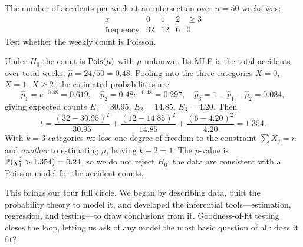 \begin{example}
The number of accidents per week at an intersection over $n=50$ weeks was:
\[
\begin{array}{c|cccc}
x & 0 & 1 & 2 & \ge 3\\\hline
\text{frequency} & 32 & 12 & 6 & 0
\end{array}
\]
Test whether the weekly count is Poisson.

\solution Under $H_0$ the count is $\mathrm{Pois}(\mu)$ with $\mu$ unknown. Its MLE is the
total accidents over total weeks, $\hat\mu=24/50=0.48$. Pooling into the three
categories $X=0$, $X=1$, $X\ge 2$, the estimated probabilities are
\[
  \hat p_1=e^{-0.48}=0.619,\quad \hat p_2=0.48e^{-0.48}=0.297,\quad \hat p_3=1-\hat p_1-\hat p_2=0.084,
\]
giving expected counts $E_1=30.95$, $E_2=14.85$, $E_3=4.20$. Then
\[
  t=\frac{(32-30.95)^2}{30.95}+\frac{(12-14.85)^2}{14.85}+\frac{(6-4.20)^2}{4.20}=1.354.
\]
With $k=3$ categories we lose one degree of freedom to the constraint
$\sum X_j=n$ and \emph{another} to estimating $\mu$, leaving $k-2=1$. The
$p$-value is $\mathbb{P}(\chi^2_1>1.354)=0.24$, so we do not reject $H_0$: the data
are consistent with a Poisson model for the accident counts.
\end{example}

\bigskip
This brings our tour full circle. We began by describing data, built the
probability theory to model it, and developed the inferential tools—estimation,
regression, and testing—to draw conclusions from it. Goodness-of-fit testing
closes the loop, letting us ask of any model the most basic question of all:
does it fit?
